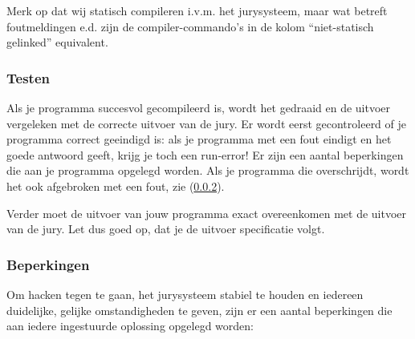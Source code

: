 \documentclass[11pt,titlepage,a4paper]{article}
\begin{document}
Merk op dat wij statisch compileren i.v.m. het jurysysteem, maar wat
betreft foutmeldingen e.d. zijn de compiler-commando's in de kolom
``niet-statisch gelinked'' equivalent.

\subsubsection{Testen}

Als je programma succesvol gecompileerd is, wordt het gedraaid en de
uitvoer vergeleken met de correcte uitvoer van de jury. Er wordt eerst
gecontroleerd of je programma correct geeindigd is: als je programma
met een fout eindigt en het goede antwoord geeft, krijg je toch een
run-error! Er zijn een aantal beperkingen die aan je programma
opgelegd worden. Als je programma die overschrijdt, wordt het ook
afgebroken met een fout, zie (\ref{runlimits}).

Verder moet de uitvoer van jouw programma exact overeenkomen met de
uitvoer van de jury. Let dus goed op, dat je de uitvoer specificatie
volgt.

\subsubsection{Beperkingen}\label{runlimits}

Om hacken tegen te gaan, het jurysysteem stabiel te houden en iedereen
duidelijke, gelijke omstandigheden te geven, zijn er een aantal
beperkingen die aan iedere ingestuurde oplossing opgelegd worden:
\end{document}
